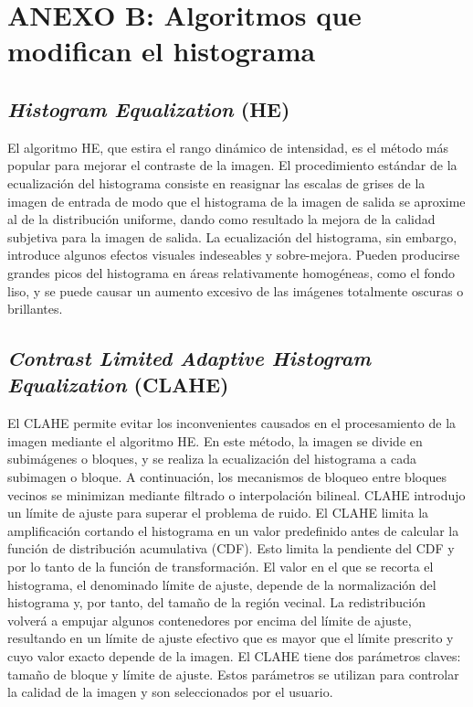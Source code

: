 \chapter*{ANEXO B: Algoritmos que modifican el histograma}
\label{ch:anexob}

\section{\textit{Histogram Equalization} (HE)}

El algoritmo HE, que estira el rango dinámico de intensidad, es el método más popular para mejorar el contraste de la imagen. El procedimiento estándar de la ecualización del histograma consiste en reasignar las escalas de grises de la imagen de entrada de modo que el histograma de la imagen de salida se aproxime al de la distribución uniforme, dando como resultado la mejora de la calidad subjetiva para la imagen de salida. La ecualización del histograma, sin embargo, introduce algunos efectos visuales indeseables y sobre-mejora. Pueden producirse grandes picos del histograma en áreas relativamente homogéneas, como el fondo liso, y se puede causar un aumento excesivo de las imágenes totalmente oscuras o brillantes.


\section{\textit{Contrast Limited Adaptive Histogram Equalization} (CLAHE)}

El CLAHE permite evitar los inconvenientes causados en el procesamiento de la imagen mediante el algoritmo HE. En este método, la imagen se divide en subimágenes o bloques, y se realiza la ecualización del histograma a cada subimagen o bloque. A continuación, los mecanismos de bloqueo entre bloques vecinos se minimizan mediante filtrado o interpolación bilineal. CLAHE introdujo un límite de ajuste para superar el problema de ruido. El CLAHE limita la amplificación cortando el histograma en un valor predefinido antes de calcular la función de distribución acumulativa (CDF). Esto limita la pendiente del CDF y por lo tanto de la función de transformación. El valor en el que se recorta el histograma, el denominado límite de ajuste, depende de la normalización del histograma y, por tanto, del tamaño de la región vecinal. La redistribución volverá a empujar algunos contenedores por encima del límite de ajuste, resultando en un límite de ajuste efectivo que es mayor que el límite prescrito y cuyo valor exacto depende de la imagen. El CLAHE tiene dos parámetros claves: tamaño de bloque y límite de ajuste. Estos parámetros se utilizan para controlar la calidad de la imagen y son seleccionados por el usuario. 